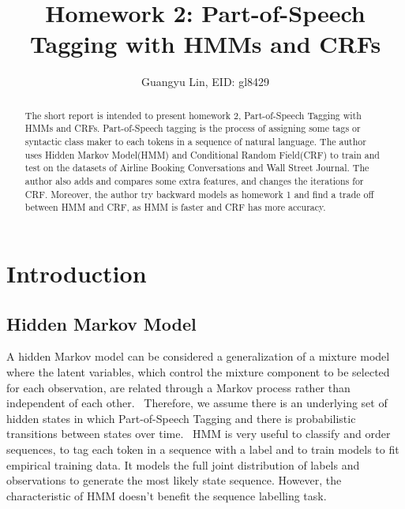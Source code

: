 \documentclass[journal, a4paper]{IEEEtran}
\begin{document}
	\title{Homework 2: Part-of-Speech Tagging with HMMs and CRFs}
	\author{Guangyu Lin, EID: gl8429
}
	\maketitle

\begin{abstract}
	The short report is intended to present homework 2, Part-of-Speech Tagging with HMMs and CRFs. Part-of-Speech tagging is the process of assigning some tags or syntactic class maker to each tokens in a sequence of natural language. The author uses Hidden Markov Model(HMM) and Conditional Random Field(CRF) to train and test on the datasets of Airline Booking Conversations and Wall Street Journal. The author also adds and compares some extra features, and changes the iterations for CRF. Moreover, the author try backward models as homework 1 and  find a trade off between HMM and CRF, as HMM is faster and CRF has more accuracy.
\end{abstract}

\section{Introduction}
\subsection{Hidden Markov Model}
A hidden Markov model can be considered a generalization of a mixture model where the latent variables, which control the mixture component to be selected for each observation, are related through a Markov process rather than independent of each other.~\cite{HMM01} Therefore, we assume there is an underlying set of hidden states in which Part-of-Speech Tagging and there is probabilistic transitions between states over time.~\cite{SLIDE03} HMM is very useful to classify and order sequences, to tag each token in a sequence with a label and to train models to fit empirical training data. It models the full joint distribution of labels and observations to generate the most likely state sequence. However, the characteristic of HMM doesn't benefit the sequence labelling task.
\end{document}
